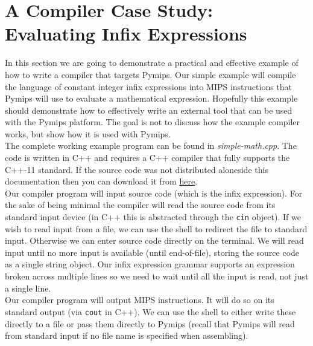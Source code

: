 \documentclass[12pt]{article}
\begin{document}
\newpage
\section{A Compiler Case Study: Evaluating Infix Expressions}

In this section we are going to demonstrate a practical and effective example of
     how to write a compiler that targets Pymips. Our simple example will
     compile the language of constant integer infix expressions into MIPS
     instructions that Pymips will use to evaluate a mathematical
     expression. Hopefully this example should demonstrate how to effectively
     write an external tool that can be used with the Pymips platform. The goal
     is not to discuss how the example compiler works, but show how it is used
     with Pymips.\\

The complete working example program can be found in
     \textit{simple-math.cpp}. The code is written in C++ and requires a C++
     compiler that fully supports the C++-11 standard. If the source code was
     not distributed aloneside this documentation then you can download it from
     \href{https://raw.githubusercontent.com/RogerGee/pymips/master/doc/simple-math.cpp}{here}.\\

Our compiler program will input source code (which is the infix expression). For
     the sake of being minimal the compiler will read the source code from its
     standard input device (in C++ this is abstracted through the \texttt{cin}
     object). If we wish to read input from a file, we can use the shell to
     redirect the file to standard input. Otherwise we can enter source code
     directly on the terminal. We will read input until no more input is
     available (until end-of-file), storing the source code as a single string
     object. Our infix expression grammar supports an expression broken across
     multiple lines so we need to wait until all the input is read, not just a
     single line.\\

Our compiler program will output MIPS instructions. It will do so on its
     standard output (via \texttt{cout} in C++). We can use the shell to either
     write these directly to a file or pass them directly to Pymips (recall that
     Pymips will read from standard input if no file name is specified when
     assembling).\\
\end{document}
